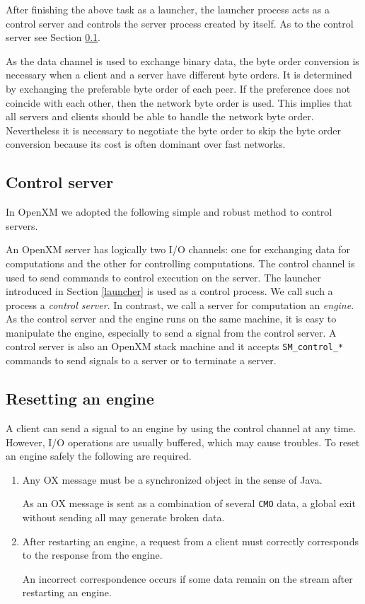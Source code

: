 After finishing the above task as a launcher, the launcher process
acts as a control server and controls the server process created by
itself. As to the control server see Section \ref{control}.

As the data channel is used to exchange binary data,
the byte order conversion is necessary when a
client and a server have different byte orders. It is determined by
exchanging the preferable byte order of each peer. If the preference
does not coincide with each other,
then the network byte order is used.
This implies that all servers and clients should be able to
handle the network byte
order. Nevertheless it is necessary to negotiate the byte order to
skip the byte order conversion because its cost is often dominant over
fast networks.


\subsection{Control server}
\label{control}
In OpenXM we adopted the following simple and robust method to 
control servers.

An OpenXM server has logically two I/O channels: one for exchanging
data for computations and the other for controlling computations. The
control channel is used to send commands to control execution on the
server. The launcher introduced in Section \ref{launcher}
is used as a control process. We call such a process a {\it
control server}. In contrast, we call a server for computation an {\it
engine}. As the control server and the engine runs on the
same machine, it is easy to manipulate the engine, especially to
send a signal from the control server. A control server is also an
OpenXM stack machine and it accepts {\tt SM\_control\_*} commands
to send signals to a server or to terminate a server.

\subsection{Resetting an engine}

A client can send a signal to an engine by using the control channel 
at any time. However, I/O operations are usually buffered,
which may cause troubles.
To reset an engine safely the following are required.

\begin{enumerate}
\item Any OX message must be a synchronized object in the sense of Java.

As an OX message is sent as a combination of several {\tt CMO}
data, a global exit without sending all may generate broken data.

\item After restarting an engine, a request from a client 
must correctly corresponds to the response from the engine.

An incorrect correspondence occurs if some data remain on the stream
after restarting an engine.
\end{enumerate}

